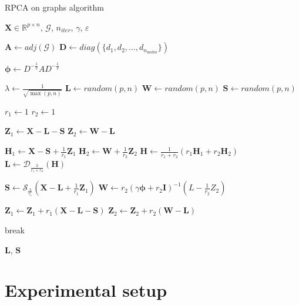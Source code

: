 \documentclass[sigconf]{acmart}
\begin{document}
  
  \begin{algorithm}[H]
  \caption{RPCA on graphs algorithm}\label{alg:our_pca}
  \begin{algorithmic}
      \Require $\mathbf{X} \in \mathbb{R}^{p \times n}$, $\mathcal{G}$, $n_{iter}$, $\gamma$, $\varepsilon$
      
      \State $\mathbf{A} \gets adj(\mathcal{G})$
      \State $\mathbf{D} \gets diag(\{d_1, d_2, ..., d_{n_{\text{nodes}}}\})$
      
      \State $\bm{\phi} \gets D^{-\frac{1}{2}} A D^{-\frac{1}{2}} $
      
      \State $\lambda \gets \frac{1}{\sqrt{\max(p, n)}}$
      \State $\mathbf{L} \gets random(p, n)$
      \State $\mathbf{W} \gets random(p, n)$
      \State $\mathbf{S} \gets random(p, n)$
      
      \State $r_1 \gets 1$
      \State $r_2 \gets 1$
      
      \State $\mathbf{Z}_1 \gets \mathbf{X} - \mathbf{L} - \mathbf{S}$
      \State $\mathbf{Z}_2 \gets \mathbf{W} - \mathbf{L}$
      
          \State $\mathbf{H}_1 \gets \mathbf{X} - \mathbf{S} + \frac{1}{r_1}\mathbf{Z}_1$
          \State $\mathbf{H}_2 \gets \mathbf{W} + \frac{1}{r_2}\mathbf{Z}_2$
          \State $\mathbf{H} \gets \frac{1}{r_1 + r_2} (r_1 \mathbf{H}_1 + r_2 \mathbf{H}_2)$
          \State $\mathbf{L} \gets \mathcal{D}_{\frac{2}{r_1 + r_2}}(\mathbf{H})$
      
          \State $\mathbf{S} \gets \mathcal{S}_{\frac{\lambda}{r_1}}(\mathbf{X} - \mathbf{L} + \frac{1}{r_1}\mathbf{Z}_1)$
          \State $\mathbf{W} \gets r_2 (\gamma \bm{\phi} + r_2 \mathbf{I})^{-1}(L - \frac{1}{r_2}Z_2)$
          
          \State $\mathbf{Z}_1 \gets \mathbf{Z}_1 + r_1(\mathbf{X} - \mathbf{L} - \mathbf{S})$
          \State $\mathbf{Z}_2 \gets \mathbf{Z}_2 + r_2(\mathbf{W} - \mathbf{L})$
      
              \State break\
          \EndIf
      
      \EndFor
      
      \State \Return $\mathbf{L}$, $\mathbf{S}$
  \end{algorithmic}
  \end{algorithm}


\section{Experimental setup}
\end{document}
